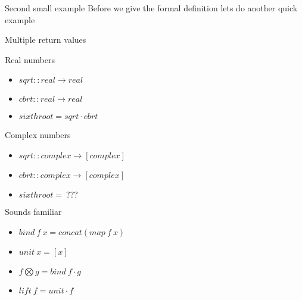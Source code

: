 \begin{frame}[fragile]{}
    \begin{block}{Second small example}
        Before we give the formal definition lets do another quick example
    \end{block}
\end{frame}

\begin{frame}[fragile]{Multiple return values}
    \begin{block}{Real numbers}
        \begin{itemize}
            \item $sqrt :: real \rightarrow real$
            \item $cbrt :: real \rightarrow real$
            \item $sixthroot = sqrt \cdot cbrt$
        \end{itemize}
    \end{block}
    \begin{block}{Complex numbers}
        \begin{itemize}
            \item $sqrt :: complex \rightarrow [complex]$
            \item $cbrt :: complex \rightarrow [complex]$
            \item $sixthroot = \: ???$
        \end{itemize}
    \end{block}
\end{frame}

\begin{frame}[fragile]{}
    \begin{block}{Sounds familiar}
        \begin{itemize}
            \item $bind \: f \: x = concat ( map \: f \: x)$
            \item $unit \: x = [x]$
            \item $f \bigotimes g = bind \: f \cdot g$
            \item $lift \: f = unit \cdot f$
        \end{itemize}
    \end{block}
\end{frame}
